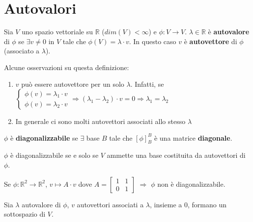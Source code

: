 \newpage
\section{Autovalori}
\begin{definition}[Autovalori]
	Sia $V$ uno spazio vettoriale su $\mathbb{R}$ ($dim(V) < \infty$) e $\phi: V \to V$. $\lambda \in \mathbb{R}$ è \textbf{autovalore} di $\phi$ se $\exists v \neq 0$ in $V$ tale che $\phi(V) = \lambda \cdot v$. In questo caso $v$ è \textbf{autovettore} di $\phi$ (associato a $\lambda$).
\end{definition}
\begin{observation}
	Alcune osservazioni su questa definizione:
	\begin{enumerate}
		\item $v$ può essere autovettore per un solo $\lambda$. Infatti, se $\begin{cases}
			\phi(v)=\lambda_{1} \cdot v \\
			\phi(v)=\lambda_{2} \cdot v
		\end{cases} \Longrightarrow (\lambda_{1} - \lambda_{2}) \cdot v = 0 \Longrightarrow \lambda_{1} = \lambda_{2}$
		\item In generale ci sono molti autovettori associati allo stesso $\lambda$
	\end{enumerate}
\end{observation}

\begin{definition}[Diagonalizzabile]
	$\phi$ è \textbf{diagonalizzabile} se $\exists$ base $B$ tale che $[\phi]^B_B$ è una matrice \textbf{diagonale}.
\end{definition}

\begin{proposition}
	$\phi$ è diagonalizzabile se e solo se $V$ ammette una base costituita da autovettori di $\phi$. \\
\end{proposition}

\begin{example}
	Se $\phi: \mathbb{R}^2 \to \mathbb{R}^2$, $v \mapsto A \cdot v$  dove $A = \begin{bmatrix}
		1 & 1 \\
		0  &1
	\end{bmatrix}$ $\Longrightarrow$ $\phi$ non è diagonalizzabile.  
\end{example}

\begin{proposition}
	Sia $\lambda$ autovalore di $\phi$, $v$ autovettori associati a $\lambda$, insieme a $0$, formano un sottospazio di $V$.
\end{proposition}

